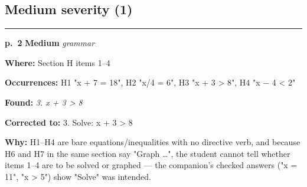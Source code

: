\documentclass[11pt]{article}
\newcommand{\sevmed}[1]{\textcolor{orange!80!black}{\textbf{#1}}}
\begin{document}
\subsection*{Medium severity (1)}
\noindent\rule{\textwidth}{0.4pt}\par\nobreak\vspace{2pt}
\noindent\textbf{p.~2} \quad \sevmed{Medium} \quad \textit{grammar}\par
\noindent\textbf{Where: }Section H items 1--4\par
\noindent\textbf{Occurrences: }H1 "x + 7 = 18", H2 "x/4 = 6", H3 "x + 3 > 8", H4 "x $-$ 4 < 2"\par
\noindent\textbf{Found: }\textit{3. x + 3 > 8}\par
\noindent\textbf{Corrected to: }3. Solve: x + 3 > 8\par
\noindent\textbf{Why: }H1--H4 are bare equations/inequalities with no directive verb, and because H6 and H7 in the same section say "Graph \ldots", the student cannot tell whether items 1--4 are to be solved or graphed --- the companion's checked answers ("x = 11", "x > 5") show "Solve" was intended.\par\vspace{4pt}
\end{document}

